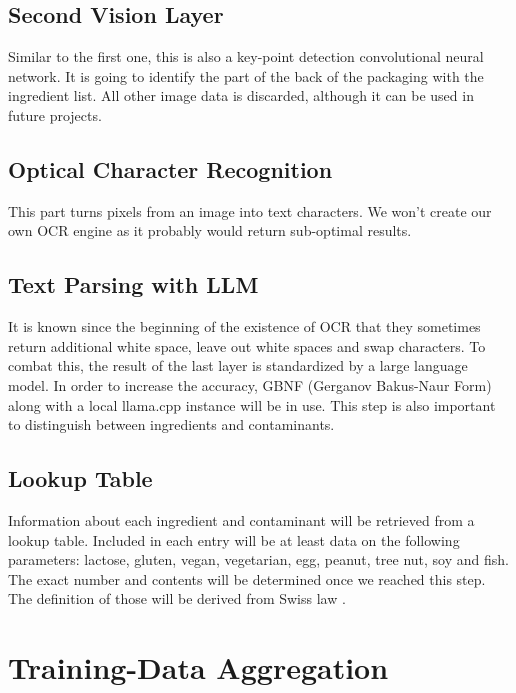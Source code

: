 \documentclass[a4paper,11pt]{report}
\begin{document}
            \subsection{Second Vision Layer}
                Similar to the first one, this is also a key-point detection convolutional neural network.
                It is going to identify the part of the back of the packaging with the ingredient list. All other image data is discarded, although it can be used in future projects.

            \subsection{Optical Character Recognition}
                This part turns pixels from an image into text characters. We won't create our own OCR engine as it probably would return sub-optimal results.

            \subsection{Text Parsing with LLM}
                It is known since the beginning of the existence of OCR that they sometimes return additional white space, leave out white spaces and swap characters. To combat this, the result of the last layer is standardized by a large language model. In order to increase the accuracy, GBNF (Gerganov Bakus-Naur Form) \cite{gbnf} along with a local llama.cpp \cite{llamacpp} instance will be in use. This step is also important to distinguish between ingredients and contaminants.

            \subsection{Lookup Table}
                \label{subsec:architecture:table}
                Information about each ingredient and contaminant will be retrieved from a lookup table. Included in each entry will be at least data on the following parameters: lactose, gluten, vegan, vegetarian, egg, peanut, tree nut, soy and fish. The exact number and contents will be determined once we reached this step. The definition of those will be derived from Swiss law \cite{fedlex-ingredient}.

        \section{Training-Data Aggregation}
\end{document}
